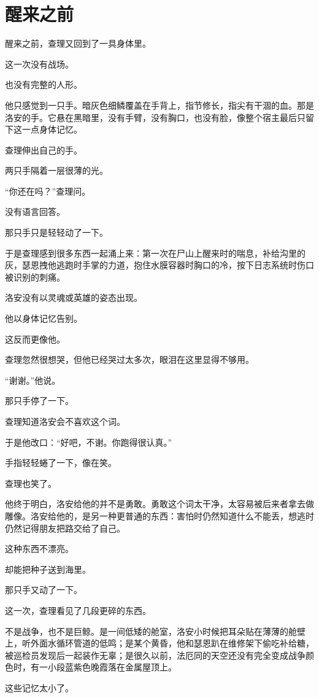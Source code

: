 \chapter{醒来之前}

醒来之前，查理又回到了一具身体里。

这一次没有战场。

也没有完整的人形。

他只感觉到一只手。暗灰色细鳞覆盖在手背上，指节修长，指尖有干涸的血。那是洛安的手。它悬在黑暗里，没有手臂，没有胸口，也没有脸，像整个宿主最后只留下这一点身体记忆。

查理伸出自己的手。

两只手隔着一层很薄的光。

“你还在吗？”查理问。

没有语言回答。

那只手只是轻轻动了一下。

于是查理感到很多东西一起涌上来：第一次在尸山上醒来时的喘息，补给沟里的灰，瑟恩拽他逃跑时手掌的力道，抱住水膜容器时胸口的冷，按下日志系统时伤口被识别的刺痛。

洛安没有以灵魂或英雄的姿态出现。

他以身体记忆告别。

这反而更像他。

查理忽然很想哭，但他已经哭过太多次，眼泪在这里显得不够用。

“谢谢。”他说。

那只手停了一下。

查理知道洛安会不喜欢这个词。

于是他改口：“好吧，不谢。你跑得很认真。”

手指轻轻蜷了一下，像在笑。

查理也笑了。

他终于明白，洛安给他的并不是勇敢。勇敢这个词太干净，太容易被后来者拿去做雕像。洛安给他的，是另一种更普通的东西：害怕时仍然知道什么不能丢，想逃时仍然记得朋友把路交给了自己。

这种东西不漂亮。

却能把种子送到海里。

那只手又动了一下。

这一次，查理看见了几段更碎的东西。

不是战争，也不是巨鲸。是一间低矮的舱室，洛安小时候把耳朵贴在薄薄的舱壁上，听外面水循环管道的低鸣；是某个黄昏，他和瑟恩趴在维修架下偷吃补给糖，被巡检员发现后一起装作无辜；是很久以前，法厄同的天空还没有完全变成战争颜色时，有一小段蓝紫色晚霞落在金属屋顶上。

这些记忆太小了。

